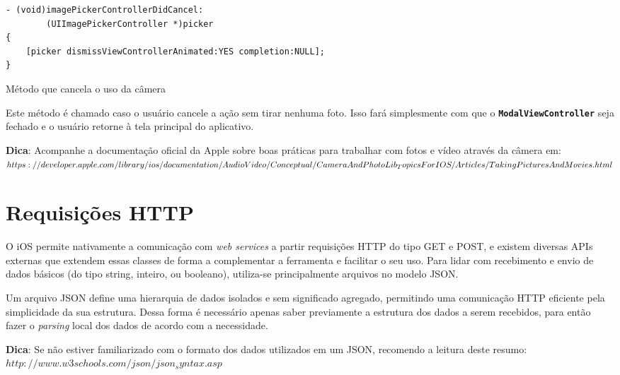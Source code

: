 \documentclass[a4paper,12pt,brazil,doubleside]{book}
\begin{document}
\begin{singlespace}
\begin{listing}[H]
\begin{verbatim}
- (void)imagePickerControllerDidCancel:
        (UIImagePickerController *)picker
{
    [picker dismissViewControllerAnimated:YES completion:NULL];
}
\end{verbatim}
\caption{Método que cancela o uso da câmera}
\end{listing}


Este método é chamado caso o usuário cancele a ação sem tirar nenhuma foto. Isso fará simplesmente com que o \texttt{\textbf{ModalViewController}} seja fechado e o usuário retorne à tela principal do aplicativo.

\bigskip

\begin{framed}

\textbf{Dica}: Acompanhe a documentação oficial da Apple sobre boas práticas para trabalhar com fotos e vídeo através da câmera em:\\
\(https://developer.apple.com/library/ios/documentation/AudioVideo/Conceptual/\\CameraAndPhotoLib_TopicsForIOS/Articles/TakingPicturesAndMovies.html\)
\end{framed}


\section{Requisições HTTP}


O iOS permite nativamente a comunicação com \emph{web services} a partir requisições HTTP do tipo GET e POST, e existem diversas APIs externas que extendem essas classes de forma a complementar a ferramenta e facilitar o seu uso. Para lidar com recebimento e envio de dados básicos (do tipo string, inteiro, ou booleano), utiliza-se principalmente arquivos no modelo JSON.

Um arquivo JSON define uma hierarquia de dados isolados e sem significado agregado, permitindo uma comunicação HTTP eficiente pela simplicidade da sua estrutura. Dessa forma é necessário apenas saber previamente a estrutura dos dados a serem recebidos, para então fazer o \emph{parsing} local dos dados de acordo com a necessidade.

\bigskip

\begin{framed}

\textbf{Dica}:  Se não estiver familiarizado com o formato dos dados utilizados em um JSON, recomendo a leitura deste resumo:\\
\(http://www.w3schools.com/json/json_syntax.asp\)


\end{framed}
\end{singlespace}
\end{document}
